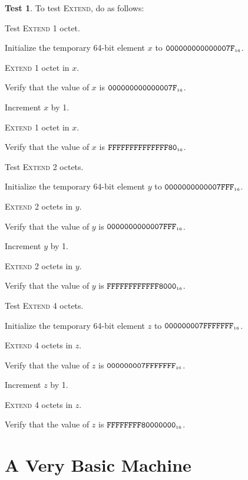 \documentclass[a4paper,12pt]{article}
\newcommand{\num}[1]{\texttt{#1}}
\newcommand{\hex}[1]{\num{#1}_{\textup{\tiny 16}}}
\newcommand{\proc}[1]{\textsc{#1}}
\theoremstyle{definition}
\newtheorem{test}{Test}
\begin{document}
\begin{test}
  To test \proc{Extend}, do as follows:
  \begin{stepnumbers}
  \item Test \proc{Extend} 1 octet.
    \begin{stepnumbers}
    \item Initialize the temporary 64-bit element $x$ to $\hex{000000000000007F}$.
    \item \proc{Extend} 1 octet in $x$.
    \item Verify that the value of $x$ is $\hex{000000000000007F}$.
    \item Increment $x$ by 1.
    \item \proc{Extend} 1 octet in $x$.
    \item Verify that the value of $x$ is $\hex{FFFFFFFFFFFFFF80}$.
    \end{stepnumbers}
  \item Test \proc{Extend} 2 octets.
    \begin{stepnumbers}
    \item Initialize the temporary 64-bit element $y$ to $\hex{0000000000007FFF}$.
    \item \proc{Extend} 2 octets in $y$.
    \item Verify that the value of $y$ is $\hex{0000000000007FFF}$.
    \item Increment $y$ by 1.
    \item \proc{Extend} 2 octets in $y$.
    \item Verify that the value of $y$ is $\hex{FFFFFFFFFFFF8000}$.
    \end{stepnumbers}
  \item Test \proc{Extend} 4 octets.
    \begin{stepnumbers}
    \item Initialize the temporary 64-bit element $z$ to $\hex{000000007FFFFFFF}$.
    \item \proc{Extend} 4 octets in $z$.
    \item Verify that the value of $z$ is $\hex{000000007FFFFFFF}$.
    \item Increment $z$ by 1.
    \item \proc{Extend} 4 octets in $z$.
    \item Verify that the value of $z$ is $\hex{FFFFFFFF80000000}$.
    \end{stepnumbers}
  \end{stepnumbers}
\end{test}
\section{A Very Basic Machine}
\end{document}
